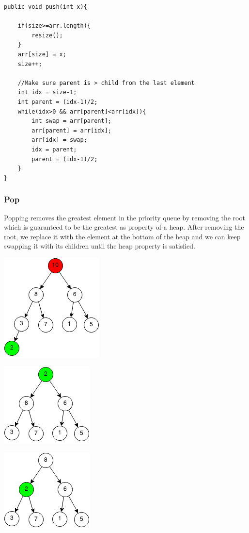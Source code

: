 \documentclass[11pt,oneside]{book}
\makeatletter
\def\maxwidth#1{\ifdim\Gin@nat@width>#1 #1\else\Gin@nat@width\fi}
\makeatother
\begin{document}
\begin{lstlisting}
public void push(int x){
        
    if(size>=arr.length){
        resize();
    }
    arr[size] = x;
    size++;
    
    //Make sure parent is > child from the last element
    int idx = size-1;
    int parent = (idx-1)/2;
    while(idx>0 && arr[parent]<arr[idx]){
        int swap = arr[parent];
        arr[parent] = arr[idx];
        arr[idx] = swap;
        idx = parent;
        parent = (idx-1)/2;
    }
}
\end{lstlisting}

\subsubsection{Pop}

Popping removes the greatest element in the priority queue by removing the root which is guaranteed to be the greatest as property of a heap. After removing the root, we replace it with the element at the bottom of the heap and we can keep swapping it with its children until the heap property is satisfied.

\vspace{5px}\includegraphics[width=\maxwidth{\textwidth}]{maxheappop.png}

\vspace{5px}\includegraphics[width=\maxwidth{\textwidth}]{maxheappop1.png}

\vspace{5px}\includegraphics[width=\maxwidth{\textwidth}]{maxheappop2.png}
\end{document}
